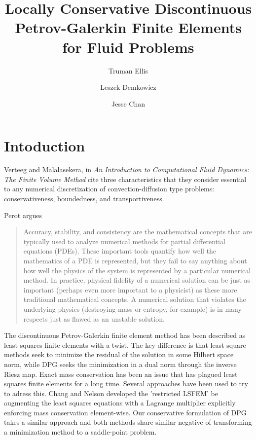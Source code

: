 \documentclass[letterpaper]{article}
\title{Locally Conservative Discontinuous Petrov-Galerkin Finite Elements for
Fluid Problems}
\author{Truman Ellis}
\author{Leszek Demkowicz}
\author{Jesse Chan}
\affil{Institute for Computational Engineering and Sciences,\\
The University of Texas at Austin, \\
Austin, TX 78712}
\date{}
\begin{document}
\maketitle

\begin{abstract}
\end{abstract}

\section{Intoduction}
Verteeg and Malalasekera, in \emph{An Introduction to Computational Fluid
Dynamics: The Finite Volume Method}\cite[p. 110-113]{IntroCFD} cite three
characteristics that they consider essential to any numerical discretization
of convection-diffusion type problems: conservativeness, boundedness, and
transportiveness.

Perot\cite{Perot2011} argues
\begin{quote}
Accuracy, stability, and consistency are the mathematical concepts that are
typically used to analyze numerical methods for partial differential equations
(PDEs). These important tools quantify how well the mathematics of a PDE is
represented, but they fail to say anything about how well the physics of the
system is represented by a particular numerical method. In practice, physical
fidelity of a numerical solution can be just as important (perhaps even more
important to a physicist) as these more traditional mathematical concepts. A
numerical solution that violates the underlying physics (destroying mass or
entropy, for example) is in many respects just as flawed as an unstable
solution.
\end{quote}

The discontinuous Petrov-Galerkin finite element method has been described as
least squares finite elements with a twist. The key difference is that least
square methods seek to minimize the residual of the solution in some Hilbert
space norm, while DPG seeks the minimization in a dual norm through the
inverse Riesz map. Exact mass conservation has been an issue that has plagued
least squares finite elements for a long time. Several approaches have been
used to try to adress this. Chang and Nelson\cite{ChangNelson1997} developed
the 'restricted LSFEM'\cite{ChangNelson1997} be augmenting the least squares
equations with a Lagrange multiplier explicitly enforcing mass conservation
element-wise. Our conservative formulation of DPG takes a similar approach and
both methods share similar negative of transforming a minimization method to a
saddle-point problem.
\end{document}
